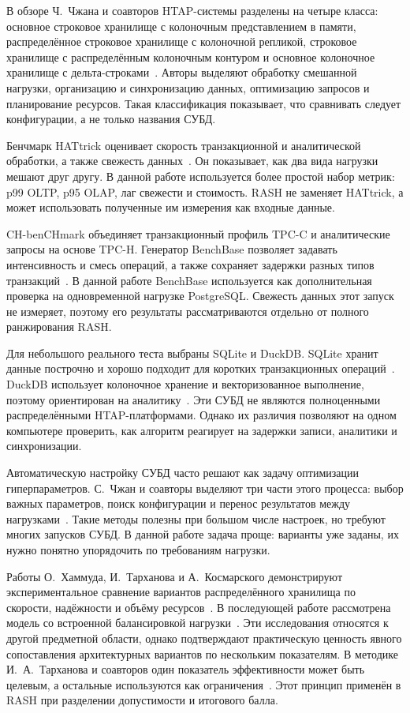 \documentclass{misisarticle}
\begin{document}
	В обзоре Ч.~Чжана и соавторов HTAP-системы разделены на четыре класса: основное строковое хранилище с колоночным представлением в памяти, распределённое строковое хранилище с колоночной репликой, строковое хранилище с распределённым колоночным контуром и основное колоночное хранилище с дельта-строками~\cite{zhangSurvey2024}. Авторы выделяют обработку смешанной нагрузки, организацию и синхронизацию данных, оптимизацию запросов и планирование ресурсов. Такая классификация показывает, что сравнивать следует конфигурации, а не только названия СУБД.

	Бенчмарк HATtrick оценивает скорость транзакционной и аналитической обработки, а также свежесть данных~\cite{milkai2022}. Он показывает, как два вида нагрузки мешают друг другу. В данной работе используется более простой набор метрик: p99 OLTP, p95 OLAP, лаг свежести и стоимость. RASH не заменяет HATtrick, а может использовать полученные им измерения как входные данные.

	CH-benCHmark объединяет транзакционный профиль TPC-C и аналитические запросы на основе TPC-H. Генератор BenchBase позволяет задавать интенсивность и смесь операций, а также сохраняет задержки разных типов транзакций~\cite{difallah2013,benchbase}. В данной работе BenchBase используется как дополнительная проверка на одновременной нагрузке PostgreSQL. Свежесть данных этот запуск не измеряет, поэтому его результаты рассматриваются отдельно от полного ранжирования RASH.

	Для небольшого реального теста выбраны SQLite и DuckDB. SQLite хранит данные построчно и хорошо подходит для коротких транзакционных операций~\cite{gaffney2022}. DuckDB использует колоночное хранение и векторизованное выполнение, поэтому ориентирован на аналитику~\cite{duckdb2019}. Эти СУБД не являются полноценными распределёнными HTAP-платформами. Однако их различия позволяют на одном компьютере проверить, как алгоритм реагирует на задержки записи, аналитики и синхронизации.

	Автоматическую настройку СУБД часто решают как задачу оптимизации гиперпараметров. С.~Чжан и соавторы выделяют три части этого процесса: выбор важных параметров, поиск конфигурации и перенос результатов между нагрузками~\cite{zhangTuning2022}. Такие методы полезны при большом числе настроек, но требуют многих запусков СУБД. В данной работе задача проще: варианты уже заданы, их нужно понятно упорядочить по требованиям нагрузки.

	Работы О.~Хаммуда, И.~Тарханова и А.~Космарского демонстрируют экспериментальное сравнение вариантов распределённого хранилища по скорости, надёжности и объёму ресурсов~\cite{hammoud2021}. В последующей работе рассмотрена модель со встроенной балансировкой нагрузки~\cite{hammoud2022}. Эти исследования относятся к другой предметной области, однако подтверждают практическую ценность явного сопоставления архитектурных вариантов по нескольким показателям. В методике И.~А.~Тарханова и соавторов один показатель эффективности может быть целевым, а остальные используются как ограничения~\cite{tarkhanov2020}. Этот принцип применён в RASH при разделении допустимости и итогового балла.
\end{document}
